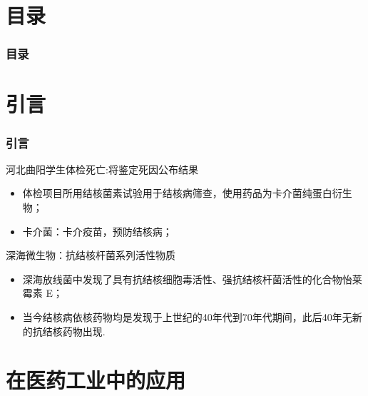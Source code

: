 \documentclass[10pt,aspectratio=43,mathserif]{beamer}
\title[含硒表面活性剂囊泡的构筑与性质研究]{\fontsize{13pt}{18pt}\selectfont {含硒表面活性剂囊泡的构筑与性质研究}}
\subtitle{\fontsize{9pt}{14pt}\selectfont \textbf{毕业论文答辩}}
\author[应用化学1502班]{
    陈育明  \\\medskip
    {\small {应用化学1502班}}
}
\institute[SCME]{
  化学与材料工程学院\\
  江南大学}
\date[2019年6月8日]{
 2019年6月8日}
\begin{document}
\begin{frame}
\titlepage
\end{frame}				%



\section*{目录}

		\begin{frame}
		\frametitle{\textbf{目录}}
		\textbf{\tableofcontents}
		\end{frame}				%

\section{引言}

    \begin{frame}
    \frametitle{引言}
    \begin{block}{河北曲阳学生体检死亡:将鉴定死因公布结果}
        \begin{itemize}
        \item 体检项目所用结核菌素试验用于结核病筛查，使用药品为卡介菌纯蛋白衍生物；
        \item 卡介菌：卡介疫苗，预防结核病；
        \end{itemize}
    \end{block}
    \begin{block}{深海微生物：抗结核杆菌系列活性物质\footnotemark[1]}
        \begin{itemize}
        \item 深海放线菌中发现了具有抗结核细胞毒活性、强抗结核杆菌活性的化合物怡莱霉素 E；
        \item 当今结核病依核药物均是发现于上世纪的40年代到70年代期间，此后40年无新的抗结核药物出现. 
        \end{itemize}
    \end{block}
    \end{frame}

\section[医药]{在医药工业中的应用}
\end{document}
